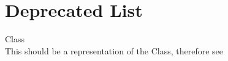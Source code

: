 \chapter{Deprecated List}
\hypertarget{deprecated}{}\label{deprecated}

\begin{DoxyRefList}
\item[Class \doxylink{class_sys_m_lv2_1_1_entities_1_1_element}{Sys\+MLv2\+::Entities\+::Element} ]\hfill \\
\label{deprecated__deprecated000001}%
%
This should be a representation of the   Class, therefore see 
\end{DoxyRefList}